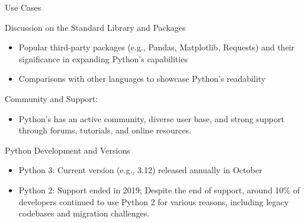 \documentclass[
	11pt, 
]{beamer}
\begin{document}
\begin{frame}{Use Cases}

\begin{block}{Discussion on the Standard Library and Packages}
\begin{itemize}
\item Popular third-party packages (e.g., Pandas, Matplotlib, Requests) and their significance in expanding Python's capabilities
\item Comparisons with other languages to showcase Python's readability
\end{itemize}
\end{block}
\bigskip
\begin{block}{Community and Support:}
\begin{itemize}
\item Python's has an active community, diverse user base, and strong support through forums, tutorials, and online resources.
\end{itemize}
\end{block}

\end{frame}





\begin{frame}{Python Development and Versions}
    \begin{itemize}
        \item Python 3: Current version (e.g., 3.12) released annually in October
        \bigskip
        \item Python 2: Support ended in 2019; Despite the end of support, around 10\% of developers continued to use Python 2 for various reasons, including legacy codebases and migration challenges.
    \end{itemize}

\end{frame}

\end{document}
